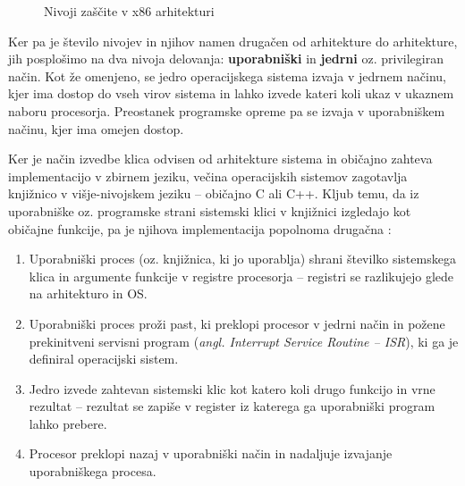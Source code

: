 \documentclass[a4paper,12pt,openright]{book}
\begin{document}
\begin{figure}[h!]
	\begin{center}
	\end{center}
	\caption{Nivoji zaščite v x86 arhitekturi \cite{Intel_2024}}
	\label{fig:privilege_levels_x86}
\end{figure}

Ker pa je število nivojev in njihov namen drugačen od arhitekture do arhitekture, jih posplošimo na dva nivoja delovanja: \textbf{uporabniški} in \textbf{jedrni} oz. privilegiran način.
Kot že omenjeno, se jedro operacijskega sistema izvaja v jedrnem načinu, kjer ima dostop do vseh virov sistema in lahko izvede kateri koli ukaz v ukaznem naboru procesorja.
Preostanek programske opreme pa se izvaja v uporabniškem načinu, kjer ima omejen dostop.

Ker je način izvedbe klica odvisen od arhitekture sistema in običajno zahteva implementacijo v zbirnem jeziku, večina operacijskih sistemov zagotavlja knjižnico v višje-nivojskem jeziku -- običajno C ali C++.
Kljub temu, da iz uporabniške oz. programske strani sistemski klici v knjižnici izgledajo kot običajne funkcije, pa je njihova implementacija popolnoma drugačna \cite{Tanenbaum_Bos_2023}:
\begin{enumerate}
	\item Uporabniški proces (oz. knjižnica, ki jo uporablja) shrani številko sistemskega klica in argumente funkcije v registre procesorja -- registri se razlikujejo glede na arhitekturo in OS.
	\item Uporabniški proces proži past, ki preklopi procesor v jedrni način in požene prekinitveni servisni program (\textit{angl. Interrupt Service Routine -- ISR}), ki ga je definiral operacijski sistem.
	\item Jedro izvede zahtevan sistemski klic kot katero koli drugo funkcijo in vrne rezultat -- rezultat se zapiše v register iz katerega ga uporabniški program lahko prebere.
	\item Procesor preklopi nazaj v uporabniški način in nadaljuje izvajanje uporabniškega procesa.
\end{enumerate}
\end{document}

